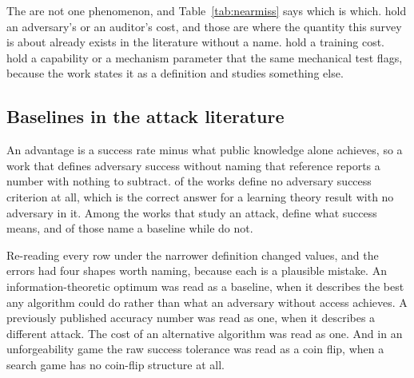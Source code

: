 The \NearMiss{} are not one phenomenon, and Table~\ref{tab:nearmiss} says which is
which. \NearMissAdv{} hold an adversary's or an auditor's cost, and those are where
the quantity this survey is about already exists in the literature without a name.
\NearMissTrain{} hold a training cost. \NearMissCap{} hold a capability or a
mechanism parameter that the same mechanical test flags, because the work states it
as a definition and studies something else.

\subsection{Baselines in the attack literature}

An advantage is a success rate minus what public knowledge alone achieves, so a
work that defines adversary success without naming that reference reports a number
with nothing to subtract. \BaselineNA{} of the \NumSources{} works define no
adversary success criterion at all, which is the correct answer for a learning
theory result with no adversary in it. Among the \NumAttackWorks{} works that
study an attack, \BaselineCrit{} define what success means, and of those
\BaselineStated{} name a baseline while \BaselineAbsent{} do not.

Re-reading every row under the narrower definition changed \BaselineChanged{}
values, and the errors had four shapes worth naming, because each is a plausible
mistake. An information-theoretic optimum was read as a baseline, when it describes
the best any algorithm could do rather than what an adversary without access
achieves. A previously published accuracy number was read as one, when it describes
a different attack. The cost of an alternative algorithm was read as one. And in an
unforgeability game the raw success tolerance was read as a coin flip, when a search
game has no coin-flip structure at all.
